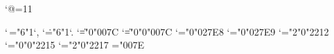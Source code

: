
\newdimen\frontmarginsep
\catcode`@=11

\mcode`\,="6"1`,
\mcode`\.="6"1`.
\delimcode`\|="0"007C
\mcode`\|="0"0"007C
\delimcode`\<="0"027E8
\delimcode`\>="0"027E9
\mcode`\-="2"0"2212
\mcode`\/="0"0"2215
\mcode`\*="2"0"2217
\def\sqrt{\mradical"0"221A }
\chardef\ttilde="007E
\def\tilde{\maccent"7"0"002DC }
\def\ldots{\mathinner{\char"2026}}
\def\cdots{\mathinner{\char"22EF}}
\def\ddots{\mathinner{\char"22F1}}
\def\rddots{\mathinner{\char"22F0}}
\def\vdots{\mathinner{\char"22EE}}
%
\newfam\frakbffam\newfam\frakfam\newfam\scriptbffam\newfam\scriptfam\newfam\sansbfitfam\newfam\sansbffam\newfam\sansitfam\newfam\sansfam
%
